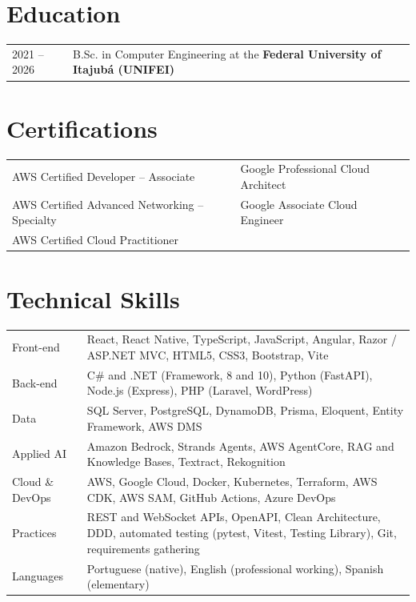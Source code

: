 \documentclass[a4paper,11pt]{article}
\begin{document}
\section{Education}
\begin{tabularx}{\linewidth}{@{}l X@{}}
2021 -- 2026 & B.Sc. in Computer Engineering at the \textbf{Federal University of Itajubá (UNIFEI)} \\
\end{tabularx}

\section{Certifications}
\begin{tabularx}{\linewidth}{@{}X X@{}}
AWS Certified Developer -- Associate & Google Professional Cloud Architect \\
AWS Certified Advanced Networking -- Specialty & Google Associate Cloud Engineer \\
AWS Certified Cloud Practitioner & \\
\end{tabularx}

\section{Technical Skills}
\begin{tabularx}{\linewidth}{@{}l X@{}}
Front-end & \normalsize{React, React Native, TypeScript, JavaScript, Angular, Razor / ASP.NET MVC, HTML5, CSS3, Bootstrap, Vite} \\
Back-end & \normalsize{C\# and .NET (Framework, 8 and 10), Python (FastAPI), Node.js (Express), PHP (Laravel, WordPress)} \\
Data & \normalsize{SQL Server, PostgreSQL, DynamoDB, Prisma, Eloquent, Entity Framework, AWS DMS} \\
Applied AI & \normalsize{Amazon Bedrock, Strands Agents, AWS AgentCore, RAG and Knowledge Bases, Textract, Rekognition} \\
Cloud \& DevOps & \normalsize{AWS, Google Cloud, Docker, Kubernetes, Terraform, AWS CDK, AWS SAM, GitHub Actions, Azure DevOps} \\
Practices & \normalsize{REST and WebSocket APIs, OpenAPI, Clean Architecture, DDD, automated testing (pytest, Vitest, Testing Library), Git, requirements gathering} \\
Languages & \normalsize{Portuguese (native), English (professional working), Spanish (elementary)} \\
\end{tabularx}

\vfill
{}
\end{document}

